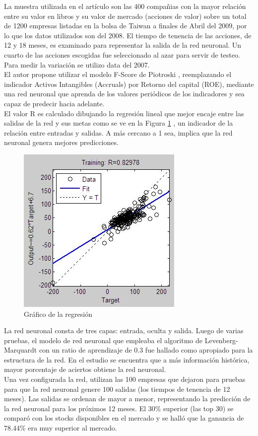 La muestra utilizada en el artículo son las 400 compañias con la mayor relación entre su valor en libros y su valor de mercado (acciones de valor) sobre un total de 1200 empresas listadas en la bolsa de Taiwan a finales de Abril del 2009, por lo que los datos utilizados son del 2008. El tiempo de tenencia de las acciones, de 12 y 18 meses, es examinado para representar la salida de la red neuronal. Un cuarto de las acciones escogidas fue seleccionado al azar para servir de testeo. Para medir la variación se utilizo data del 2007.\\

El autor propone utilizar el modelo F-Score de Piotroski \cite{Piotroski2000}, reemplazando el indicador Activos Intangibles (Accruals) por Retorno del capital (ROE), mediante una red neuronal que aprenda de los valores periódicos de los indicadores y sea capaz de predecir hacia adelante.\\

El valor R es calculado dibujando la regresión lineal que mejor encaje entre las salidas de la red y sus metas como se ve en la Figura \ref{graf:regression-plot} \cite{Shen2011}, un indicador de la relación entre entradas y salidas. A más cercano a 1 sea, implica que la red neuronal genera mejores predicciones.\\

\begin{figure}[ht!]
   \centering
   \includegraphics[scale=0.5]{imagenes/regression_plot.jpeg}
   \caption{Gráfico de la regresi\'on \cite{Shen2011}}\label{graf:regression-plot}
\end{figure}


La red neuronal consta de tres capas: entrada, oculta y salida. Luego de varias pruebas, el modelo de red neuronal que empleaba el algoritmo de Levenberg-Marquardt con un ratio de aprendizaje de 0.3 fue hallado como apropiado para la estructura de la red. En el estudio se encuentra que a más información histórica, mayor porcentaje de aciertos obtiene la red neuronal.\\

Una vez configurada la red, utilizan las 100 empresas que dejaron para pruebas para que la red neuronal genere 100 salidas (los tiempos de tenencia de 12 meses). Las salidas se ordenan de mayor a menor, representando la predicción de la red neuronal para los próximos 12 meses. El 30\% superior (las top 30) se comparó con los stocks disponibles en el mercado y se halló que la ganancia de 78.44\% era muy superior al mercado.\\